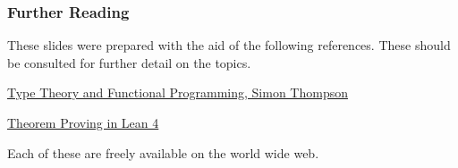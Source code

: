 \documentclass{beamer}
\theoremstyle{indentDefn} \newtheorem{defn}[]{Definition}
\begin{document}
%	
\begin{frame}
	\frametitle{Further Reading}
	
    These slides were prepared with the aid of the following references. These should be consulted for further detail on the topics. 
    
    \href{https://www.cs.kent.ac.uk/people/staff/sjt/TTFP/}{Type Theory and Functional Programming, Simon Thompson}
    
    \href{https://leanprover.github.io/theorem_proving_in_lean4/}{Theorem Proving in Lean 4}
    
    Each of these are freely available on the world wide web.
    
    \vspace{50mm}  
	
\end{frame}
\end{document}
